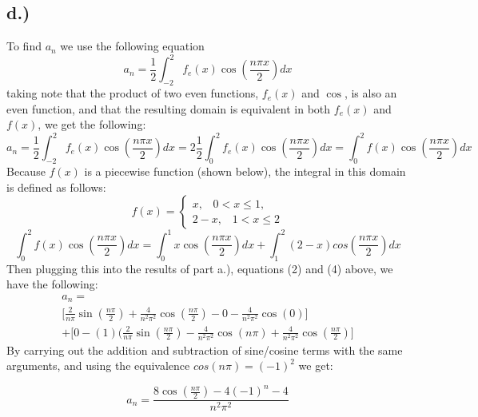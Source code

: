 \documentclass{article}
\begin{document}
\subsection*{d.)}
To find $a_n$ we use the following equation
\begin{equation}
a_n = \frac{1}{2} \int_{-2}^2 f_e(x)\cos(\frac{n\pi x}{2})dx
\end{equation}
taking note that the product of two even functions, $f_e(x)$ and $\cos$, is also an even function, and that the resulting domain is equivalent in both $f_e(x)$ and $f(x)$, we get the following:
\begin{equation}
a_n = \frac{1}{2} \int_{-2}^2 f_e(x)\cos(\frac{n\pi x}{2})dx = 2\frac{1}{2} \int_0^2 f_e(x)\cos(\frac{n\pi x}{2})dx = \int_0^2 f(x)\cos(\frac{n\pi x}{2})dx
\end{equation}
Because $f(x)$ is a piecewise function (shown below), the integral in this domain is defined as follows:
\[f(x)=
  \begin{cases}
			x, \; \; \; 0<x\leq 1, \\
			2-x, \; \; \; 1 < x \leq 2
            \end{cases}
\]
\begin{equation}
 \int_0^2 f(x)\cos(\frac{n\pi x}{2})dx = \int_0^1 x\cos(\frac{n\pi x}{2})dx + \int_1^2 (2-x)cos(\frac{n\pi x}{2})dx
\end{equation}
Then plugging this into the results of part a.), equations (2) and (4) above, we have the following:
\begin{multline}
a_n = \\ \Big[ \frac{2}{n\pi}\sin(\frac{n\pi}{2}) + \frac{4}{n^2\pi^2}\cos(\frac{n\pi}{2}) - 0 - \frac{4}{n^2\pi^2}\cos(0) \Big] \\ + \Big[ 0 - (1)(\frac{2}{n\pi}\sin(\frac{n\pi}{2}) - \frac{4}{n^2\pi^2}\cos(n\pi) + \frac{4}{n^2\pi^2}\cos(\frac{n\pi}{2}) \Big]
\end{multline}
By carrying out the addition and subtraction of sine/cosine terms with the same arguments, and using the equivalence $cos(n\pi) = (-1)^2$ we get:
\begin{tcolorbox}[minipage,colback=white,arc=0pt,outer arc=0pt]
\begin{equation}
a_n = \frac{8\cos(\frac{n\pi}{2}) - 4(-1)^n - 4}{n^2\pi^2}
\end{equation}
\end{tcolorbox}
\end{document}
